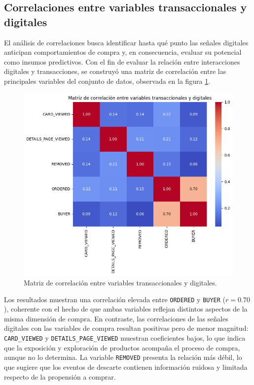\subsection{Correlaciones entre variables transaccionales y digitales}

El análisis de correlaciones busca identificar hasta qué punto las señales digitales anticipan comportamientos de compra y, en consecuencia, evaluar su potencial como insumos predictivos. Con el fin de evaluar la relación entre interacciones digitales y transacciones, se construyó una matriz de correlación entre las principales variables del conjunto de datos, observada en la figura \ref{fig:heatmap_corr}. 

\begin{figure}[htpb]
	\centering
	\includegraphics[scale=.55]{./Figures/heatmap_corr.png}
	\caption{Matriz de correlación entre variables transaccionales y digitales.}
	\label{fig:heatmap_corr}
\end{figure}

Los resultados muestran una correlación elevada entre \texttt{ORDERED} y \texttt{BUYER} ($r=0.70$), coherente con el hecho de que ambas variables reflejan distintos aspectos de la misma dimensión de compra. En contraste, las correlaciones de las señales digitales con las variables de compra resultan positivas pero de menor magnitud: \texttt{CARD\_VIEWED} y \texttt{DETAILS\_PAGE\_VIEWED} muestran coeficientes bajos, lo que indica que la exposición y exploración de productos acompaña el proceso de compra, aunque no lo determina. La variable \texttt{REMOVED} presenta la relación más débil, lo que sugiere que los eventos de descarte contienen información ruidosa y limitada respecto de la propensión a comprar.

